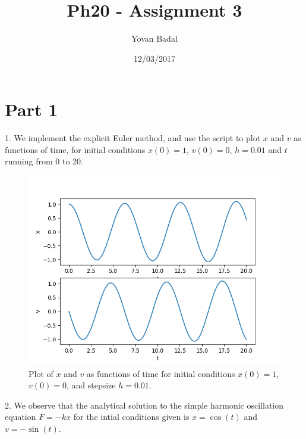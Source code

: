 \documentclass[11pt]{article}
\begin{document}
	\title{Ph20 - Assignment 3}
	\author{Yovan Badal}
	\date{12/03/2017}
	\maketitle
	
\section*{Part 1}
1. We implement the explicit Euler method, and use the script to plot $x$ and $v$ as functions of time, for initial conditions $x(0) = 1$, $v(0) = 0$, $h = 0.01$ and $t$ running from 0 to 20.
\begin{figure}[htp]
\centering
\includegraphics[scale=0.54]{x_and_v_plot_1_0_0-01_20.png}
\caption{Plot of $x$ and $v$ as functions of time for initial conditions $x(0) = 1$, $v(0) = 0$, and stepsize $h = 0.01$.}
\label{explicit}
\end{figure}
\newpage

2. We observe that the analytical solution to the simple harmonic oscillation equation $F = -kx$ for the intial conditions given is $x = \cos(t)$ and $v = -\sin(t)$.
\end{document}
